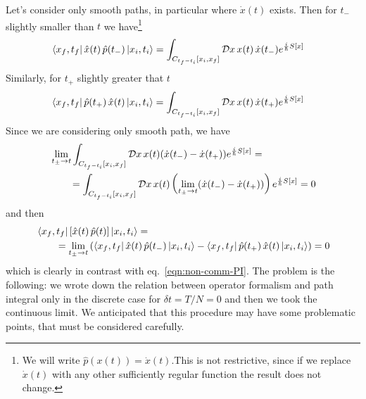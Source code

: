 \documentclass[../main/main.tex]{subfiles}
\begin{document}
Let's consider only smooth paths, in particular where $\dot x(t)$ exists. Then for $t_-$ slightly smaller than $t$ we have\footnote{We will write $\hat p(x(t))=\dot x(t)$.This is not restrictive, since if we replace $\dot x(t)$ with any other sufficiently regular function the result does not change.}
\begin{align*}
\bra{x_f,t_f}\hat x(t)\,\hat p(t_-)\ket{x_i,t_i}
&=\int_{C_{t_f-t_i}[x_i,x_f]}\mathcal Dx\,x(t)\,\dot x(t_-)e^{\frac i\hbar S[x]}
\end{align*}
Similarly, for $t_+$ slightly greater that $t$
\begin{align*}
\bra{x_f,t_f}\hat p(t_+)\,\hat x(t)\ket{x_i,t_i}
&=\int_{C_{t_f-t_i}[x_i,x_f]}\mathcal Dx\,x(t)\,\dot x(t_+)e^{\frac i\hbar S[x]}
\end{align*}
Since we are considering only smooth path, we have
\begin{align*}
&\lim_{t_\pm\to t}\int_{C_{t_f-t_i}[x_i,x_f]}\mathcal Dx\,x(t)(\dot x(t_-)-\dot x(t_+))e^{\frac i\hbar S[x]}=\\
&\qquad=\int_{C_{t_f-t_i}[x_i,x_f]}\mathcal Dx\,x(t)\left(\lim_{t_\pm\to t}(\dot x(t_-)-\dot x(t_+))\right)e^{\frac i\hbar S[x]}=0
\end{align*}
and then
\begin{align*}
&\bra{x_f,t_f}\left[\hat x(t)\,\hat p(t)\right]\ket{x_i,t_i}=\\
&\qquad=\lim_{t_\pm\to t}\left(\bra{x_f,t_f}\hat x(t)\,\hat p(t_-)\ket{x_i,t_i}-\bra{x_f,t_f}\hat p(t_+)\,\hat x(t)\ket{x_i,t_i}\right)=0
\end{align*}
which is clearly in contrast with eq.~\eqref{eqn:non-comm-PI}. The problem is the following: we wrote down the relation between operator formalism and path integral only in the discrete case for $\delta t=T/N=0$ and then we took the continuous limit. We anticipated that this procedure may have some problematic points, that must be considered carefully. 
\end{document}
